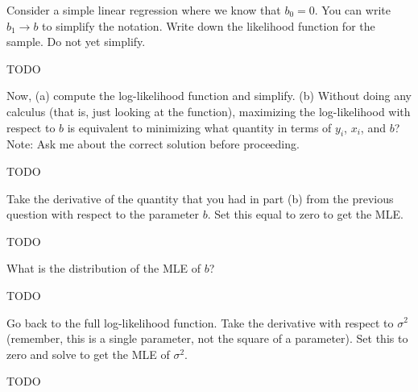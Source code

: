 
Consider a simple linear regression where we know that $b_0 = 0$. You can write
$b_1 \rightarrow b$ to simplify the notation. Write down the likelihood function
for the sample. Do not yet simplify.


TODO



Now, (a) compute the log-likelihood function and simplify. (b) Without doing any
calculus (that is, just looking at the function), maximizing the log-likelihood
with respect to $b$ is equivalent to minimizing what quantity in terms of $y_i$,
$x_i$, and $b$? Note: Ask me about the correct solution before proceeding. 


TODO


Take the derivative of the quantity that you had in part (b) from the previous
question with respect to the parameter $b$. Set this equal to zero to get the 
MLE.


TODO


What is the distribution of the MLE of $b$?


TODO


Go back to the full log-likelihood function. Take the derivative with respect
to $\sigma^2$ (remember, this is a single parameter, not the square of a parameter).
Set this to zero and solve to get the MLE of $\sigma^2$.


TODO



